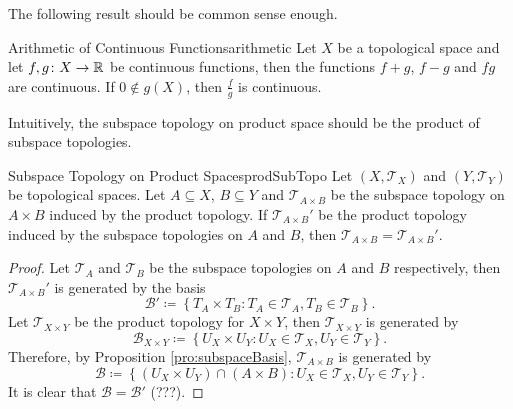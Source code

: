 \documentclass[math]{amznotes}
\theoremstyle{remark}
\begin{document}
The following result should be common sense enough.
\begin{corbox}{Arithmetic of Continuous Functions}{arithmetic}
    Let $X$ be a topological space and let $f, g \colon X \to \mathbb{R}$ be continuous functions, then the functions $f + g$, $f - g$ and $fg$ are continuous. If $0 \notin g\left(X\right)$, then $\frac{f}{g}$ is continuous.
\end{corbox}
Intuitively, the subspace topology on product space should be the product of subspace topologies.
\begin{probox}{Subspace Topology on Product Spaces}{prodSubTopo}
    Let $\left(X, \mathcal{T}_X\right)$ and $\left(Y, \mathcal{T}_Y\right)$ be topological spaces. Let $A \subseteq X$, $B \subseteq Y$ and $\mathcal{T}_{A \times B}$ be the subspace topology on $A \times B$ induced by the product topology. If $\mathcal{T}_{A \times B}'$ be the product topology induced by the subspace topologies on $A$ and $B$, then $\mathcal{T}_{A \times B} = \mathcal{T}_{A \times B}'$.
    \tcblower
    \begin{proof}
        Let $\mathcal{T}_A$ and $\mathcal{T}_B$ be the subspace topologies on $A$ and $B$ respectively, then $\mathcal{T}_{A \times B}'$ is generated by the basis 
        \begin{equation*}
            \mathcal{B}' \coloneqq \left\{T_A \times T_B \colon T_A \in \mathcal{T}_A, T_B \in \mathcal{T}_B\right\}.
        \end{equation*}
        Let $\mathcal{T}_{X \times Y}$ be the product topology for $X \times Y$, then $\mathcal{T}_{X \times Y}$ is generated by 
        \begin{equation*}
            \mathcal{B}_{X \times Y} \coloneqq \left\{U_X \times U_Y \colon U_X \in \mathcal{T}_X, U_Y \in \mathcal{T}_Y\right\}.
        \end{equation*}
        Therefore, by Proposition \ref{pro:subspaceBasis}, $\mathcal{T}_{A \times B}$ is generated by 
        \begin{equation*}
            \mathcal{B} \coloneqq \left\{\left(U_X \times U_Y\right) \cap \left(A \times B\right) \colon U_X \in \mathcal{T}_X, U_Y \in \mathcal{T}_Y\right\}.
        \end{equation*}
        It is clear that $\mathcal{B} = \mathcal{B}'$ (???).
    \end{proof}
\end{probox}
\end{document}
